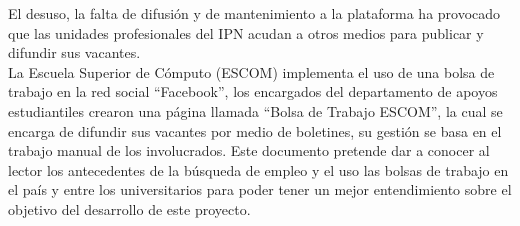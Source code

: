 El desuso, la falta de difusión y de mantenimiento a la plataforma ha provocado que las unidades profesionales del IPN acudan a otros medios para publicar y difundir sus vacantes.\cite{Siboltra} \\
\newline
La Escuela Superior de Cómputo (ESCOM) implementa el uso de una bolsa de trabajo en la red social ``Facebook'', los encargados del departamento
de apoyos estudiantiles crearon una página llamada ``Bolsa de Trabajo ESCOM'', la cual se encarga de difundir sus vacantes por medio 
de boletines, su gestión se basa en el trabajo manual de los involucrados. 
\newline
Este documento pretende dar a conocer al lector los antecedentes de la búsqueda de empleo y el uso las bolsas de trabajo en el país y entre los universitarios para poder tener un mejor entendimiento sobre el objetivo del desarrollo de este proyecto.

